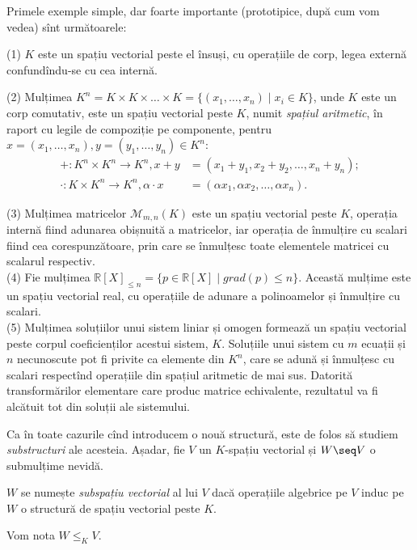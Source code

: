 Primele exemple simple, dar foarte importante (prototipice, după cum vom vedea) 
sînt următoarele:
\begin{example} 
(1) $K$ este un spațiu vectorial peste el însuși, cu operațiile de corp, 
legea externă confundîndu-se cu cea internă.

(2) Mulțimea $K^n = K \times K \times \dots \times K 
= \{(x_1,\dots,x_n) \mid x_i \in K\}$, unde $K$ este un corp comutativ, 
este un spațiu vectorial peste $K$, numit \emph{spațiul aritmetic}, în 
raport cu legile de compoziție pe componente, pentru 
$x = (x_1,\dots,x_n), y = (y_1,\dots,y_n) \in K^n$:
\begin{align*}
+ : K^n \times K^n \to K^n, x + y 
&= (x_1 + y_1, x_2 + y_2, \dots, x_n + y_n); \\
\cdot : K \times K^n \to K^n, \alpha \cdot x 
&= (\alpha x_1, \alpha x_2, \dots, \alpha x_n).
\end{align*}

(3) Mulțimea matricelor $\mathcal{M}_{m,n}(K)$ este un spațiu vectorial 
peste $K$, operația internă fiind adunarea obișnuită a matricelor, iar 
operația de înmulțire cu scalari fiind cea corespunzătoare, prin care se 
înmulțesc toate elementele matricei cu scalarul respectiv. \\

(4) Fie mulțimea 
$\mathbb{R}[X]_{\leq n} = \{p \in \mathbb{R}[X] \mid grad(p) \leq n \}$. 
Această mulțime este un spațiu vectorial real, cu operațiile de adunare a 
polinoamelor și înmulțire cu scalari. \\

(5) Mulțimea soluțiilor unui sistem liniar și omogen formează un spațiu 
vectorial peste corpul coeficienților acestui sistem, $K$. Soluțiile unui 
sistem cu $m$ ecuații și $n$ necunoscute pot fi privite ca elemente din 
$K^n$, care se adună și înmulțesc cu scalari respectînd operațiile din 
spațiul aritmetic de mai sus. Datorită transformărilor elementare care produc 
matrice echivalente, rezultatul va fi alcătuit tot din soluții ale sistemului.
\end{example}

Ca în toate cazurile cînd introducem o nouă structură, este de folos să 
studiem \emph{substructuri} ale acesteia.
Așadar, fie $V$ un $K$-spațiu vectorial și $W \seq V$ o submulțime nevidă.
\begin{definition}
$W$ se numește \emph{subspațiu vectorial} al lui $V$ dacă operațiile algebrice 
pe $V$ induc pe $W$ o structură de spațiu vectorial peste $K$.

Vom nota $W \leq_K V$.
\end{definition}


